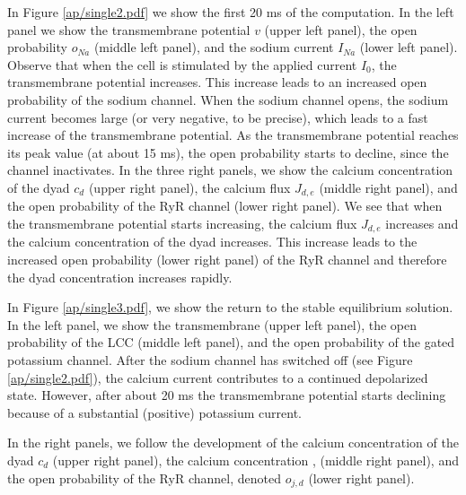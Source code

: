 In Figure \ref{ap/single2.pdf} we show the first 20 ms of the computation. In the left panel we show the transmembrane potential $v$ (upper left panel), the open probability $o_{Na}$ (middle left panel), and the sodium current $I_{Na}$ (lower left panel). Observe that when the cell is stimulated by the applied current $I_0$, the transmembrane potential increases. This increase leads to an increased open probability of the sodium channel. When the sodium channel opens, the sodium current becomes large (or very negative, to be precise), which leads to a fast increase of the transmembrane potential. As the transmembrane potential reaches its peak value (at about 15 ms), the open probability starts to decline, since the channel inactivates. In the three right panels, we show the calcium concentration of the dyad $c_d$ (upper right panel), the calcium flux $J_{d,e}$ (middle right panel), and the open probability of the RyR channel  (lower right panel). We see that when the transmembrane potential starts increasing, the calcium flux $J_{d,e}$ increases and the calcium concentration of the dyad increases. This increase leads to the increased open probability (lower right panel) of the RyR channel and therefore the dyad concentration increases rapidly. 

In Figure \ref{ap/single3.pdf}, we show the return to the stable equilibrium solution. In the left panel, we show the transmembrane (upper left panel), the open probability of the LCC (middle left panel), and the open probability of the gated potassium channel. After the sodium channel has switched off (see Figure \ref{ap/single2.pdf}), the calcium current contributes to a continued depolarized state. However, after about 20 ms the transmembrane potential starts declining because of a substantial (positive) potassium current. 

In the right panels, we follow the development of the calcium concentration of the dyad $c_d$ (upper right panel),  the calcium concentration 
,
(middle right panel), and the open probability of the RyR channel, denoted $o_{j,d}$ (lower right panel). 

